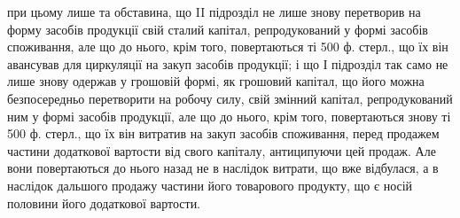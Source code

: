 при цьому лише та обставина, що II підрозділ не лише знову перетворив
на форму засобів продукції свій сталий капітал, репродукований
у формі засобів споживання, але що до нього, крім того, повертаються
ті 500 ф. стерл., що їх він авансував для циркуляції на закуп засобів
продукції; і що І підрозділ так само не лише знову одержав у грошовій
формі, як грошовий капітал, що його можна безпосередньо перетворити
на робочу силу, свій змінний капітал, репродукований ним у формі засобів
продукції, але що до нього, крім того, повертаються знову ті
500 ф. стерл., що їх він витратив на закуп засобів споживання, перед продажем
частини додаткової вартости від свого капіталу, антиципуючи цей
продаж. Але вони повертаються до нього назад не в наслідок витрати,
що вже відбулася, а в наслідок дальшого продажу частини його товарового
продукту, що є носій половини його додаткової вартости.
